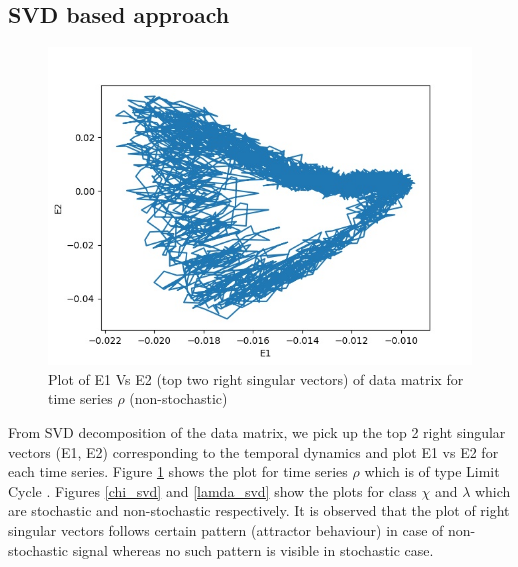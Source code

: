 \documentclass[10pt,conference]{IEEEtran}
\begin{document}
\subsection{SVD based approach}

\begin{figure}[ht]
  \centering
  \includegraphics[width=\linewidth]{rho_svd.jpg}
  \caption{Plot of E1 Vs E2 (top two right singular vectors) of data matrix for  time series $\rho$ (non-stochastic)}
  \label{svd_rho}
\end{figure}

From SVD decomposition of the data matrix, we pick up the top 2 right singular vectors (E1, E2) corresponding to the temporal dynamics and plot E1 vs E2 for each time series. Figure \ref{svd_rho} shows the plot for time series $\rho$ which is of type Limit Cycle \cite{misra2006}. Figures \ref{chi_svd} and \ref{lamda_svd} show the plots for class $\chi$ and $\lambda$  which are stochastic and non-stochastic respectively. It is observed that the plot of right singular vectors follows certain pattern (attractor behaviour) in case of non-stochastic signal whereas no such pattern is visible in stochastic case.
\end{document}
